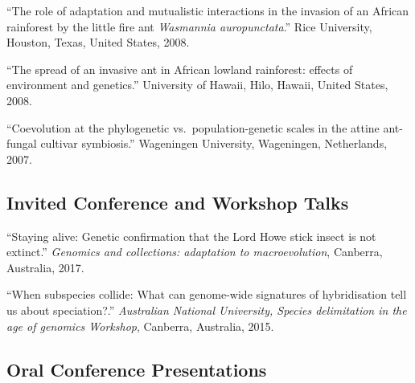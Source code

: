 \documentclass[11pt]{article}
\def\printdate#1{\xprintdate#1-}
\def\xprintdate#1-#2-#3-{#1}
\begin{document}
\ind ``The role of adaptation and mutualistic interactions in the invasion of
an African rainforest by the little fire ant
\textit{Wasmannia auropunctata}.'' Rice University, Houston, Texas, United States, \printdate{2008-00-00}.


\ind ``The spread of an invasive ant in African lowland rainforest: effects of
environment and genetics.'' University of Hawaii, Hilo, Hawaii, United States, \printdate{2008-00-00}.


\ind ``Coevolution at the phylogenetic vs.~population-genetic scales in the
attine ant-fungal cultivar symbiosis.'' Wageningen University, Wageningen, Netherlands, \printdate{2007-00-00}.



\subsection{Invited Conference and Workshop Talks}









\ind ``Staying alive: Genetic confirmation that the Lord Howe stick insect is
not extinct.'' \emph{Genomics and collections: adaptation to macroevolution}, Canberra, Australia, \printdate{2017-06-14}.












\ind ``When subspecies collide: What can genome-wide signatures of
hybridisation tell us about speciation?.'' \emph{Australian National University, Species delimitation in the age of
genomics Workshop}, Canberra, Australia, \printdate{2015-00-00}.


























\subsection{Oral Conference Presentations}
\end{document}
